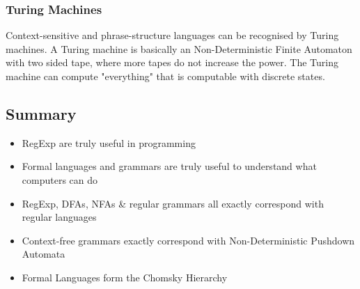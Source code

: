 \subsubsection{Turing Machines}
Context-sensitive and phrase-structure languages can be recognised by Turing machines. A Turing machine is basically an Non-Deterministic Finite Automaton with two sided tape, where more tapes do not increase the power. The Turing machine can compute "everything" that is computable with discrete states.
\subsection{Summary}
\begin{itemize}
    \item RegExp are truly useful in programming
    \item  Formal languages and grammars are truly useful to understand what computers can do
    \item RegExp, DFAs, NFAs & regular grammars all exactly correspond with regular languages
    \item Context-free grammars exactly correspond with Non-Deterministic Pushdown Automata
    \item Formal Languages form the Chomsky Hierarchy
\end{itemize}
